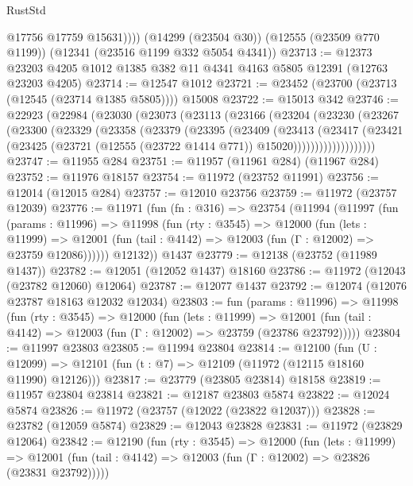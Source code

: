 \begin{lexlean}{RustStd}
\begin{coremodule}
            @17756
            @17759
            @15631))))
    (@14299 (@23504 @30))
    (@12555 (@23509 @770 @1199))
    (@12341 (@23516 @1199 @332 @5054 @4341))
@23713 := @12373 @23203 @4205 @1012 @1385 @382 @11 @4341 @4163 @5805 @12391 (@12763 @23203 @4205)
@23714 := @12547 @1012
@23721 := @23452 (@23700 (@23713 (@12545 (@23714 @1385 @5805)))) @15008
@23722 := @15013 @342
@23746 := @22923
    (@22984
      (@23030
        (@23073
          (@23113
            (@23166
              (@23204
                (@23230
                  (@23267
                    (@23300
                      (@23329
                        (@23358
                          (@23379
                            (@23395
                              (@23409
                                (@23413
                                  (@23417
                                    (@23421
                                      (@23425
                                        (@23721
                                          (@12555 (@23722 @1414 @771))
                                          @15020)))))))))))))))))))
@23747 := @11955 @284
@23751 := @11957 (@11961 @284) (@11967 @284)
@23752 := @11976 @18157
@23754 := @11972 (@23752 @11991)
@23756 := @12014 (@12015 @284)
@23757 := @12010 @23756
@23759 := @11972 (@23757 @12039)
@23776 := @11971
    (fun (fn : @316) =>
    @23754
      (@11994
        (@11997
          (fun (params : @11996) =>
          @11998
            (fun (rty : @3545) =>
            @12000
              (fun (lets : @11999) =>
              @12001 (fun (tail : @4142) => @12003 (fun (Γ : @12002) => @23759 @12086))))))
        @12132))
    @1437
@23779 := @12138 (@23752 (@11989 @1437))
@23782 := @12051 (@12052 @1437) @18160
@23786 := @11972 (@12043 (@23782 @12060) @12064)
@23787 := @12077 @1437
@23792 := @12074 (@12076 @23787 @18163 @12032 @12034)
@23803 := fun (params : @11996) =>
  @11998
    (fun (rty : @3545) =>
    @12000
      (fun (lets : @11999) =>
      @12001 (fun (tail : @4142) => @12003 (fun (Γ : @12002) => @23759 (@23786 @23792)))))
@23804 := @11997 @23803
@23805 := @11994 @23804
@23814 := @12100
    (fun (U : @12099) => @12101 (fun (t : @7) => @12109 (@11972 (@12115 @18160 @11990) @12126)))
@23817 := @23779 (@23805 @23814) @18158
@23819 := @11957 @23804 @23814
@23821 := @12187 @23803 @5874
@23822 := @12024 @5874
@23826 := @11972 (@23757 (@12022 (@23822 @12037)))
@23828 := @23782 (@12059 @5874)
@23829 := @12043 @23828
@23831 := @11972 (@23829 @12064)
@23842 := @12190
    (fun (rty : @3545) =>
    @12000
      (fun (lets : @11999) =>
      @12001 (fun (tail : @4142) => @12003 (fun (Γ : @12002) => @23826 (@23831 @23792)))))

\end{coremodule}
\end{lexlean}
